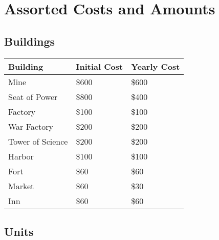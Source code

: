 
\chapter{Assorted Costs and Amounts}


\section{Buildings}

\begin{center}
\begin{tabular}{|p{1.3in}|p{1.3in}|p{1.3in}|}
	\hline
	Building	& Initial Cost & Yearly Cost \\ \hline
Mine	& \$600 & \$600 \\ \hline
Seat of Power	& \$800 & \$400 \\ \hline
Factory	& \$100 & \$100 \\ \hline
War Factory	& \$200 & \$200 \\ \hline
Tower of Science	& \$200 & \$200 \\ \hline
Harbor	& \$100 &\$100  \\ \hline
Fort	& \$60 & \$60 \\ \hline
Market	& \$60 & \$30 \\ \hline
Inn	& \$60 & \$60 \\ \hline
\end{tabular}	
\end{center}

\clearpage

\section{Units}

